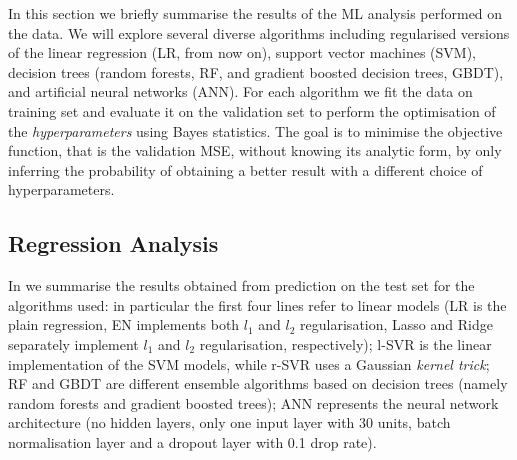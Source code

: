 In this section we briefly summarise the results of the ML analysis performed
on the data.
We will explore several diverse algorithms including regularised versions of
the linear regression (LR, from now on), support vector machines (SVM),
decision trees (random forests, RF, and gradient boosted decision trees, GBDT),
and artificial neural networks (ANN).
For each algorithm we fit the data on training set and evaluate it on the
validation set to perform the optimisation of the \textit{hyperparameters}
using Bayes statistics.
The goal is to minimise the objective function, that is the validation MSE,
without knowing its analytic form, by only inferring the probability of
obtaining a better result with a different choice of hyperparameters.

\subsection{Regression Analysis}\label{sec:ml:regr}

In  we summarise the results obtained from prediction on the
test set for the algorithms used: in particular the first four lines refer to
linear models (LR is the plain regression, EN implements both $l_1$ and $l_2$
regularisation, Lasso and Ridge separately implement $l_1$ and $l_2$
regularisation, respectively); l-SVR is the linear implementation of the SVM
models, while r-SVR uses a Gaussian \textit{kernel trick}; RF and GBDT are
different ensemble algorithms based on decision trees (namely random forests
and gradient boosted trees); ANN represents the neural network architecture (no
hidden layers, only one input layer with 30 units, batch normalisation layer
and a dropout layer with 0.1 drop rate).

